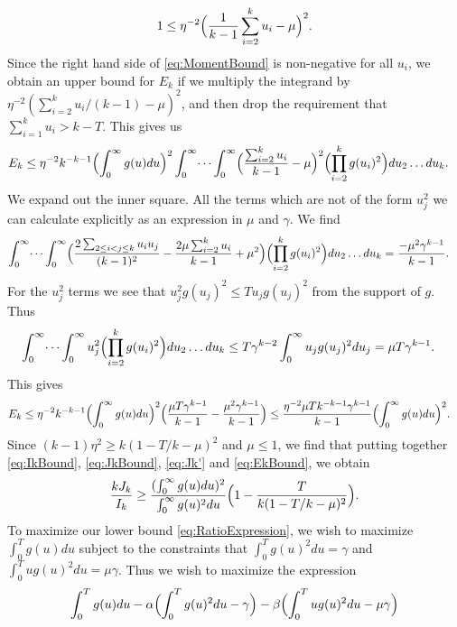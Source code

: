 \documentclass[12pt,a4paper]{amsart}
\theoremstyle{plain}
\numberwithin{sblmm}{thrm}
\numberwithin{equation}{section}
\begin{document}
\begin{equation}
1\le \eta^{-2}\Bigl(\frac{1}{k-1}\sum_{i=2}^ku_i-\mu\Bigr)^2.\label{eq:MomentBound}
\end{equation}
Since the right hand side of \eqref{eq:MomentBound} is non-negative for all $u_i$, we obtain an upper bound for $E_k$ if we multiply the integrand by $\eta^{-2}(\sum_{i=2}^ku_i/(k-1)-\mu)^2$, and then drop the requirement that $\sum_{i=1}^ku_i>k-T$. This gives us
\begin{align}
E_k&\le \eta^{-2}k^{-k-1}\Bigl(\int_0^\infty g(u)du\Bigr)^2\int_0^\infty\dotsi\int_0^\infty \Bigl(\frac{\sum_{i=2}^ku_i}{k-1}-\mu\Bigr)^2\Bigl(\prod_{i=2}^kg(u_i)^2\Bigr) du_2\dotsc du_k.
\end{align}
We expand out the inner square. All the terms which are not of the form $u_j^2$ we can calculate explicitly as an expression in $\mu$ and $\gamma$. We find
\begin{align}
\int_0^\infty\dotsi\int_0^\infty\Bigl(\frac{2\sum_{2\le i<j\le k}u_iu_j}{(k-1)^2}-\frac{2\mu\sum_{i=2}^ku_i}{k-1}+\mu^2\Bigr)\Bigl(\prod_{i=2}^kg(u_i)^2\Bigr) du_2\dotsc du_k&=\frac{-\mu^2\gamma^{k-1}}{k-1}.
\end{align}
For the $u_j^2$ terms we see that $u_j^2g(u_j)^2\le Tu_jg(u_j)^2$ from the support of $g$. Thus
\begin{align}
\int_0^\infty \dotsi\int_0^\infty u_j^2 \Bigl(\prod_{i=2}^k g(u_i)^2\Bigr)du_2\dotsc du_k& \le T \gamma^{k-2}\int_0^\infty u_j g(u_j)^2du_j= \mu T \gamma^{k-1}.
\end{align}
This gives
\begin{align}
E_k&\le \eta^{-2}k^{-k-1}\Bigl(\int_0^\infty g(u)du\Bigr)^2\Bigl(\frac{\mu T \gamma^{k-1}}{k-1}-\frac{\mu^2 \gamma^{k-1}}{k-1}\Bigr)\le \frac{\eta^{-2} \mu T k^{-k-1} \gamma^{k-1} }{k-1}\Bigl(\int_0^\infty g(u)du\Bigr)^2.\label{eq:EkBound}
\end{align}
Since $(k-1)\eta^2\ge k(1-T/k-\mu)^2$ and $\mu\le 1$, we find that putting together \eqref{eq:IkBound}, \eqref{eq:JkBound}, \eqref{eq:Jk'} and \eqref{eq:EkBound}, we obtain
\begin{equation}
\frac{kJ_k}{I_k}\ge \frac{(\int_0^\infty g(u)du)^2}{\int_0^\infty g(u)^2du}\Bigl(1-\frac{T}{k(1-T/k-\mu)^2}\Bigr).\label{eq:RatioExpression}
\end{equation}
To maximize our lower bound \eqref{eq:RatioExpression}, we wish to maximize $\int_0^T g(u)du$ subject to the constraints that $\int_0^T g(u)^2du=\gamma$ and $\int_0^T ug(u)^2du=\mu\gamma$. Thus we wish to maximize the expression
\begin{equation}
\int_0^T g(u)du-\alpha\Bigl(\int_0^T g(u)^2du-\gamma\Bigr)-\beta\Bigl(\int_0^T ug(u)^2du-\mu\gamma\Bigr)
\end{equation}
\end{document}
